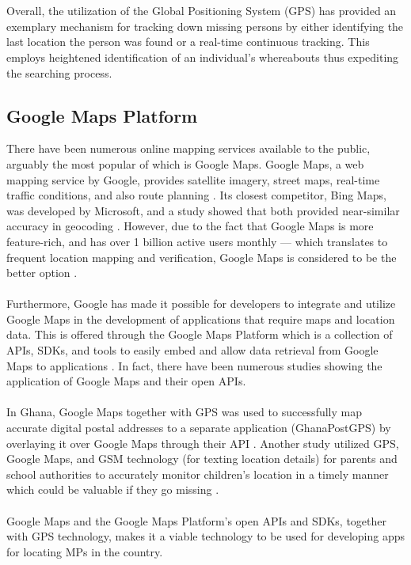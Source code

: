 \\\\Overall, the utilization of the Global Positioning System (GPS) has provided an exemplary mechanism for tracking down missing persons by either identifying the last location the person was found or a real-time continuous tracking. This employs heightened identification of an individual’s whereabouts thus expediting the searching process.

\subsection{Google Maps Platform}

There have been numerous online mapping services available to the public, arguably the most popular of which is Google Maps. Google Maps, a web mapping service by Google, provides satellite imagery, street maps, real-time traffic conditions, and also route planning \cite{antony_2021}. Its closest competitor, Bing Maps, was developed by Microsoft, and a study showed that both provided near-similar accuracy in geocoding \cite{kilic2020accuracy}. However, due to the fact that Google Maps is more feature-rich, and has over 1 billion active users monthly — which translates to frequent location mapping and verification, Google Maps is considered to be the better option \cite{lookingbill2019google}.
\\\\Furthermore, Google has made it possible for developers to integrate and utilize Google Maps in the development of applications that require maps and location data. This is offered through the Google Maps Platform which is a collection of APIs, SDKs, and tools to easily embed and allow data retrieval from Google Maps to applications \cite{googleDevelopers}. In fact, there have been numerous studies showing the application of Google Maps and their open APIs. 
\\\\In Ghana, Google Maps together with GPS was used to successfully map accurate digital postal addresses to a separate application (GhanaPostGPS) by overlaying it over Google Maps through their API \cite{gah2018using}. Another study utilized GPS, Google Maps, and GSM technology (for texting location details) for parents and school authorities to accurately monitor children’s location in a timely manner which could be valuable if they go missing \cite{sunehra2016children}.
\\\\Google Maps and the Google Maps Platform’s open APIs and SDKs, together with GPS technology, makes it a viable technology to be used for developing apps for locating MPs in the country.


